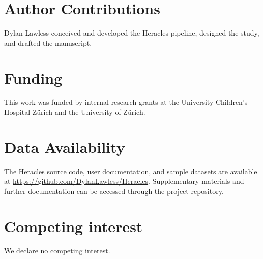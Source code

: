 \section*{Author Contributions}
\noindent
Dylan Lawless conceived and developed the Heracles pipeline, designed the study, and drafted the manuscript.

\section*{Funding}
\noindent
This work was funded by internal research grants at the University Children's Hospital Zürich and the University of Zürich.

\section*{Data Availability}
\noindent
The Heracles source code, user documentation, and sample datasets are available at \url{https://github.com/DylanLawless/Heracles}. Supplementary materials and further documentation can be accessed through the project repository.

\section*{Competing interest}
\noindent
We declare no competing interest. 

\clearpage



